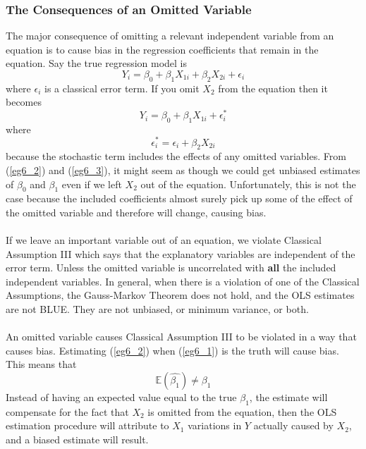 \documentclass[11pt]{article}
\begin{document}
\subsubsection{The Consequences of an Omitted Variable}
The major consequence of omitting a relevant independent variable from an equation is to cause bias in the regression coefficients that remain in the equation. Say the true regression model is 
\begin{equation}
Y_i = \beta_0 + \beta_1X_{1i} + \beta_2X_{2i} + \epsilon_i \label{eg6_1}
\end{equation}
where $\epsilon_i$ is a classical error term. If you omit $X_2$ from the equation then it becomes 
\begin{equation}
Y_i = \beta_0 + \beta_1X_{1i} + \epsilon_i^* \label{eg6_2}
\end{equation}
where 
\begin{equation}
\epsilon_i^* = \epsilon_i + \beta_2X_{2i} \label{eg6_3}
\end{equation}
because the stochastic term includes the effects of any omitted variables. From (\ref{eg6_2}) and (\ref{eg6_3}), it might seem as though we could get unbiased estimates of $\beta_0$ and $\beta_1$ even if we left $X_2$ out of the equation. Unfortunately, this is not the case because the included coefficients almost surely pick up some of the effect of the omitted variable and therefore will change, causing bias.\\ \\
If we leave an important variable out of an equation, we violate Classical Assumption III which says that the explanatory variables are independent of the error term. Unless the omitted variable is uncorrelated with \textbf{all} the included independent variables. In general, when there is a violation of one of the Classical Assumptions, the Gauss-Markov Theorem does not hold, and the OLS estimates are not BLUE. They are not unbiased, or minimum variance, or both.\\ \\
An omitted variable causes Classical Assumption III to be violated in a way that causes bias. Estimating (\ref{eg6_2}) when (\ref{eg6_1}) is the truth will cause bias. This means that
\begin{equation}
\mathbb{E}(\hat{\beta_1}) \neq \beta_1 \label{eg6_4}
\end{equation}
Instead of having an expected value equal to the true $\beta_1$, the estimate will compensate for the fact that $X_2$ is omitted from the equation, then the OLS estimation procedure will attribute to $X_1$ variations in $Y$ actually caused by $X_2$, and a biased estimate will result.\\ \\
\end{document}
